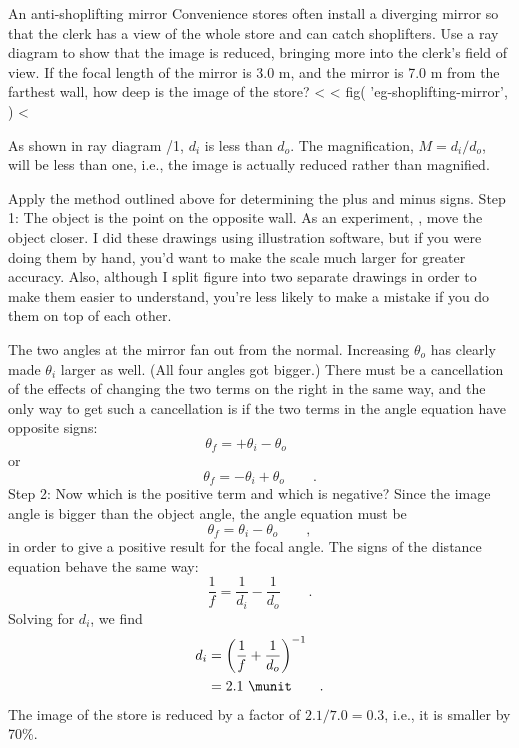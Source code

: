 \begin{eg}{An anti-shoplifting mirror}\label{eg:shoplifting-mirror}
\egquestion Convenience stores often install a diverging
mirror so that the clerk has a view of the whole store and
can catch shoplifters. Use a ray diagram to show that the
image is reduced, bringing more into the clerk's field of
view. If the focal length of the mirror is 3.0 m, and the
mirror is 7.0 m from the farthest wall, how deep is
the image of the store?
<%
<%
  fig(
    'eg-shoplifting-mirror',
  )
<%

\eganswer 
As shown in ray diagram /1, $d_i$ is less than
$d_o$. The magnification, $M= d_i/d_o$, will be less than
one, i.e., the image is actually reduced rather than magnified.

Apply the method outlined above for determining the
plus and minus signs. Step 1: 
The object is the point on the
opposite wall. As an experiment, , move the
object closer. I did these drawings using illustration
software, but if you were doing them by hand, you'd want to
make the scale much larger for greater accuracy. Also,
although I split figure  into two separate drawings in
order to make them easier to understand, you're less likely
to make a mistake if you do them on top of each other.

        The two angles at the mirror fan out from the normal.
Increasing $\theta_o$ has clearly made $\theta_i$ larger as
well. (All four angles got bigger.) There must be a
cancellation of the effects of changing the two terms on the
right in the same way, and the only way to get such a
cancellation is if the two terms in the angle equation
have opposite signs:
\begin{equation*}
                        \theta_f =  + \theta_i  -  \theta_o \qquad
\end{equation*}
or
\begin{equation*}
                        \theta_f =  - \theta_i  +  \theta_o   \qquad   .
\end{equation*}
        Step 2: Now which is the positive term and which is
negative? Since the image angle is bigger than the object
angle, the angle equation must be
\begin{equation*}
                        \theta_f =     \theta_i  -  \theta_o   \qquad   ,
\end{equation*}
in order to give a positive result for the focal angle. The
signs of the distance equation behave the same way:
\begin{equation*}
                        \frac{1}{f}         = \frac{1}{d_i}-\frac{1}{d_o}      \qquad   .
\end{equation*}
Solving for $d_i$, we find
\begin{align*}
                        d_i         &= \left(\frac{1}{f}+\frac{1}{d_o}\right)^{-1}\\
                                 &= 2.1\ \munit \qquad .
\end{align*}
The image of the store is reduced by a factor of $2.1/7.0=0.3$,
i.e., it is smaller by 70\%.
\end{eg}

